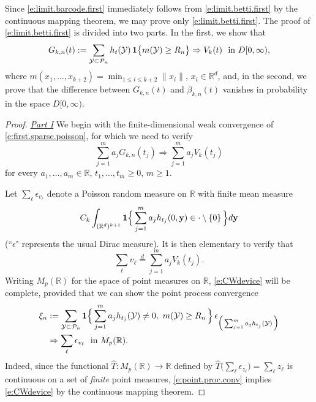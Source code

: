 \documentclass[11pt]{amsart}
\numberwithin{equation}{section}
\theoremstyle{plain}
\theoremstyle{definition}
\begin{document}
Since \eqref{e:limit.barcode.first} immediately follows from \eqref{e:limit.betti.first} by the continuous mapping theorem, we may prove only \eqref{e:limit.betti.first}.
The proof of \eqref{e:limit.betti.first} is divided into two parts. In the first, we show that
\begin{align}
G_{k,n}(t) := \sum_{{{\mathcal{Y}}} \subset {\mathcal P_n}} h_t({{\mathcal{Y}}})\, {{\bf 1}} \bigl\{ m({{\mathcal{Y}}}) \geq R_n \bigr\} \Rightarrow V_k(t) \ \ \text{in } D[0,\infty),  \label{e:first.sparse.poisson}
\end{align}
where $m(x_1,\dots,x_{k+2}) = \min_{1 \leq i \leq k+2} \| x_i \|$, $x_i \in {{\mathbb R}}^d$, and, in the second, we prove that the difference between $G_{k,n}(t)$ and $\beta_{k,n}(t)$ vanishes in probability in the space $D[0,\infty)$.
\begin{proof}
\noindent \underline{\textit{Part I}} We begin with the finite-dimensional weak convergence of \eqref{e:first.sparse.poisson}, for which we need to verify
\begin{equation}  \label{e:CWdevice}
\sum_{j=1}^m a_j G_{k,n}(t_j) \Rightarrow \sum_{j=1}^m a_j V_k(t_j)
\end{equation}
for every $a_1, \dots, a_m \in {{\mathbb R}}$, $t_1, \dots, t_m \geq 0$, $m \geq 1$.

Let $\sum_\ell \epsilon_{v_\ell}$ denote a Poisson random measure on ${{\mathbb R}}$ with finite mean measure
$$
C_k \int_{({{\mathbb R}}^d)^{k+1}} {{\bf 1}} \Bigl\{ \, \sum_{j=1}^m a_j h_{t_j}(0,{{\bf y}}) \in \cdot \setminus \{ 0 \}\, \Bigr\}d{{\bf y}}
$$
(``$\epsilon$" represents the usual Dirac measure). It is then elementary to verify that
$$
\sum_{\ell} v_\ell \stackrel{d}{=} \sum_{j=1}^m a_j V_k(t_j).
$$
Writing $M_p({{\mathbb R}})$ for the space of point measures on ${{\mathbb R}}$, \eqref{e:CWdevice} will be complete, provided that we can show the point process convergence
\begin{align}
\xi_n &:= \sum_{{{\mathcal{Y}}} \subset {\mathcal P_n}} {{\bf 1}} \Bigl\{ \, \sum_{j=1}^m a_j h_{t_j}({{\mathcal{Y}}}) \neq 0, \ m({{\mathcal{Y}}}) \geq R_n\, \Bigr\}\, \epsilon_{\Bigl(\, \sum_{j=1}^m a_j h_{t_j}({{\mathcal{Y}}})\, \Bigr)} \label{e:point.proc.conv} \\
&\Rightarrow \sum_\ell \epsilon_{v_\ell} \ \ \text{in } M_p({{\mathbb R}}). \notag
\end{align}
Indeed, since the functional $\widehat T: M_p({{\mathbb R}}) \to {{\mathbb R}}$ defined by $\widehat T \bigl( \sum_\ell \epsilon_{z_\ell} \bigr) = \sum_\ell z_\ell$ is continuous on a set of \textit{finite} point measures, \eqref{e:point.proc.conv} implies \eqref{e:CWdevice} by the continuous mapping theorem.


\end{proof}
\end{document}
